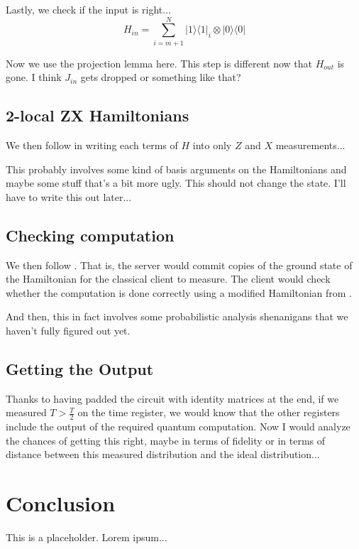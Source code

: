 \documentclass{article}
\theoremstyle{definition}
\begin{document}
Lastly, we check if the input is right...
	$$H_{in}=\sum_{i=m+1}^N|1\rangle\langle1|_i\otimes|0\rangle\langle0|$$

Now we use the projection lemma here. This step is different now that $H_{out}$ is gone. I think $J_{in}$ gets dropped or something like that?

\subsection{2-local ZX Hamiltonians}

We then follow \cite{0704.1287} in writing each terms of $H$ into only $Z$ and $X$ measurements...

This probably involves some kind of basis arguments on the Hamiltonians and maybe some stuff that's a bit more ugly. This should not change the state. I'll have to write this out later...

\subsection{Checking computation}

We then follow \cite{1804.01082}. That is, the server would commit copies of the ground state of the Hamiltonian for the classical client to measure. The client would check whether the computation is done correctly using a modified Hamiltonian from \cite{quant-ph/0406180}. 

And then, this in fact involves some probabilistic analysis shenanigans that we haven't fully figured out yet.

\subsection{Getting the Output}

Thanks to having padded the circuit with identity matrices at the end, if we measured $T>\frac{T}{2}$ on the time register, we would know that the other registers include the output of the required quantum computation. Now I would analyze the chances of getting this right, maybe in terms of fidelity or in terms of distance between this measured distribution and the ideal distribution...

\section{Conclusion}

This is a placeholder. Lorem ipsum...
\end{document}
